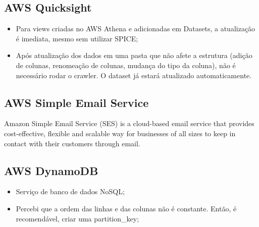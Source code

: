 \subsection{AWS Quicksight}

    \begin{itemize}
        \item Para views criadas no AWS Athena e adicionadas em Datasets, a atualização é imediata, mesmo sem utilizar SPICE;
        
        \item Após atualização dos dados em uma pasta que não afete a estrutura (adição de colunas, renomeação de colunas, mudança do tipo da coluna), não é necessário rodar o crawler. O dataset já estará atualizado automaticamente.
    \end{itemize}

\subsection{AWS Simple Email Service}
Amazon Simple Email Service (SES) is a cloud-based email service that provides cost-effective, flexible and scalable way for businesses of all sizes to keep in contact with their customers through email.

\subsection{AWS DynamoDB}
\begin{itemize}
    \item Serviço de banco de dados NoSQL;
    \item Percebi que a ordem das linhas e das colunas não é constante. Então, é recomendável, criar uma partition\_key;
\end{itemize}
